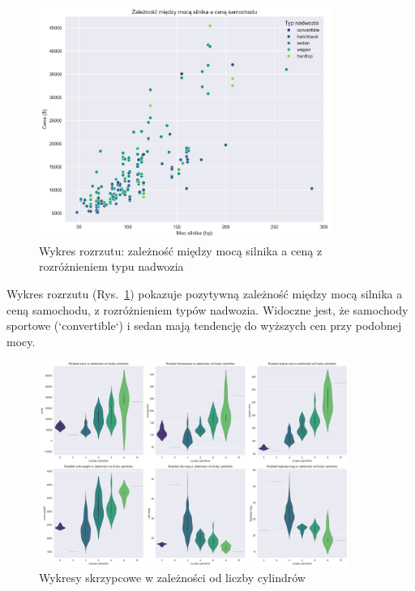 \documentclass[12pt,a4paper]{article}
\begin{document}
\begin{figure}[H]
    \centering
    \includegraphics[width=0.85\textwidth]{figures/scatter_horsepower_price.png}
    \caption{Wykres rozrzutu: zależność między mocą silnika a ceną z rozróżnieniem typu nadwozia}
    \label{fig:scatter_horsepower_price}
\end{figure}

Wykres rozrzutu (Rys.~\ref{fig:scatter_horsepower_price}) pokazuje pozytywną zależność między mocą silnika a ceną samochodu, z rozróżnieniem typów nadwozia. Widoczne jest, że samochody sportowe (`convertible`) i sedan mają tendencję do wyższych cen przy podobnej mocy.

\begin{figure}[H]
    \centering
    \includegraphics[width=0.9\textwidth]{figures/violin_by_cylinders.png}
    \caption{Wykresy skrzypcowe w zależności od liczby cylindrów}
    \label{fig:violin_by_cylinders}
\end{figure}
\end{document}
